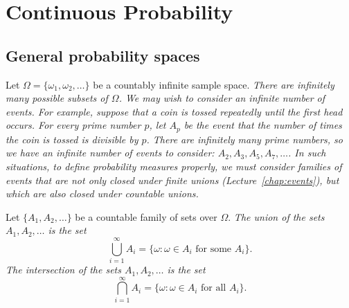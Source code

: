 \chapter{Continuous Probability}\label{chap:cts}


\section{General probability spaces}

Let $\Omega = \{\omega_1,\omega_2,\ldots\}$ be a countably infinite sample space.
\bit
\it There are infinitely many possible subsets of $\Omega$.
\it We may wish to consider an infinite number of events.
\eit
For example, suppose that a coin is tossed repeatedly until the first head occurs. For every prime number $p$, let $A_p$ be the event that the number of times the coin is tossed is divisible by $p$. There are infinitely many prime numbers, so we have an infinite number of events to consider: $A_2, A_3, A_5, A_7,\ldots$. In such situations, to define probability measures properly, we must consider families of events that are not only closed under finite unions (Lecture~\ref{chap:events}), but which are also closed under \emph{countable} unions.

\begin{definition}
Let $\{A_1,A_2,\ldots\}$ be a countable family of sets over $\Omega$.
\ben
\it The \emph{union} of the sets $A_1,A_2,\ldots$ is the set
\[
\textstyle\bigcup_{i=1}^\infty A_i = \{\omega:\omega\in A_i \text{ for some }A_i\}.
\]
\it The \emph{intersection} of the sets $A_1,A_2,\ldots$ is the set
\[
\textstyle\bigcap_{i=1}^\infty A_i = \{\omega:\omega\in A_i \text{ for all } A_i\}.
\]
\een
\end{definition}

